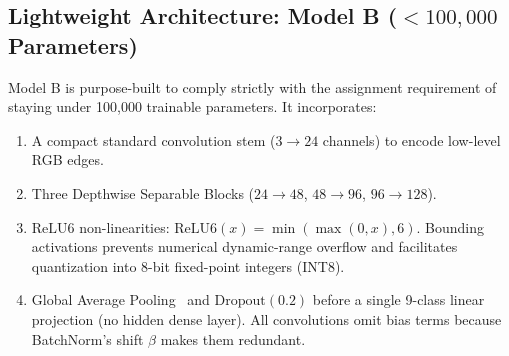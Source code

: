 \documentclass[11pt,a4paper]{article}
\begin{document}
\subsection{Lightweight Architecture: Model B ($<100,000$ Parameters)}
Model B is purpose-built to comply strictly with the assignment requirement of staying under 100,000 trainable parameters. It incorporates:
\begin{enumerate}[leftmargin=*,itemsep=1pt]
  \item A compact standard convolution stem ($3 \to 24$ channels) to encode low-level RGB edges.
  \item Three Depthwise Separable Blocks ($24 \to 48$, $48 \to 96$, $96 \to 128$).
  \item $\text{ReLU6}$ non-linearities: $\text{ReLU6}(x) = \min(\max(0, x), 6)$. Bounding activations prevents numerical dynamic-range overflow and facilitates quantization into 8-bit fixed-point integers (INT8).
  \item Global Average Pooling~\cite{gap} and $\text{Dropout}(0.2)$ before a single 9-class linear projection (no hidden dense layer). All convolutions omit bias terms because BatchNorm's shift $\beta$ makes them redundant.
\end{enumerate}
\end{document}
